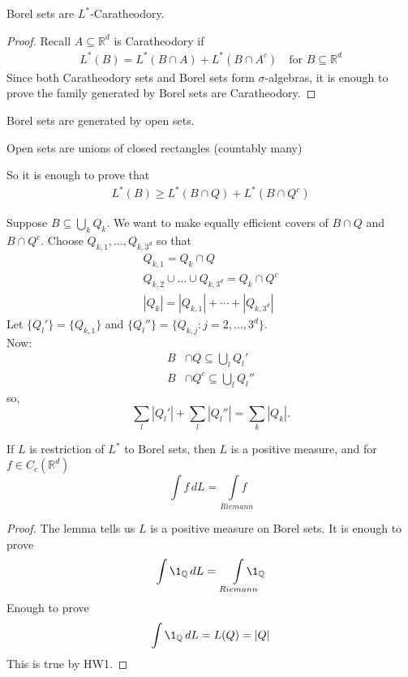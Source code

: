 \begin{lemma}
	Borel sets are $L^*$-Caratheodory.
\end{lemma}

\begin{proof}
	Recall $A \subseteq \mathbb{R}^d$ is Caratheodory if
	\begin{align*}
	L^*(B) = L^*(B \cap A ) + L^*(B \cap A^{c}) \quad \text{for } B \subseteq \mathbb{R}^d
	\end{align*}
	Since both Caratheodory sets and Borel sets form $\sigma$-algebras, it is enough to prove the family generated by Borel sets are Caratheodory.
\end{proof}

Borel sets are generated by open sets.

\begin{claim}
	Open sets are unions of closed rectangles (countably many)

	So it is enough to prove that
	\begin{align*}
	L^*(B) \geq L^*(B \cap Q) + L^* (B\cap Q^{c})
	\end{align*}
\end{claim}

Suppose $B \subseteq \bigcup_{k} Q_{k}$. We want to make equally efficient covers of $B \cap Q$ and $B \cap Q^{c}$. Choose $Q_{k,1}, \ldots , Q_{k,3^d}$ so that
\begin{gather*}
	Q_{k,1} = Q_{k} \cap Q \\
	Q_{k,2} \cup \ldots \cup Q_{k,3^d} = Q_{k} \cap Q^{c} \\
	|Q_{k}| = |Q_{k,1}| + \cdots + | Q_{k,3^d} |
\end{gather*}
Let $\{Q_{l}'\} = \{Q_{k,1}\}$ and $\{Q_{l}''\} = \{Q_{k,j} : j = 2, \ldots , 3^d\}$. \\
Now:
 \begin{align*}
	 B & \cap Q \subseteq \bigcup_{l} Q_{l}' \\
	 B & \cap Q^{c} \subseteq \bigcup_{l} Q_{l}''
\end{align*}
so,
\[
	\sum_{l} |Q_{l}'| + \sum_{l} | Q_{l}''| = \sum_{k} |Q_k|. 
\]

\begin{theorem}
	If $L$ is restriction of $L^*$ to Borel sets, then $L$ is a positive measure, and for $f \in C_{c} (\mathbb{R}^d)$
	\[
		\int f \,dL = \underset{Riemann}{\int f}
	\]
\end{theorem}

\begin{proof}
	The lemma tells us $L$ is a positive measure on Borel sets. It is enough to prove
	\[
		\int \1_{\mathbb{Q}} \,dL = \underset{Riemann}{\int} \kern-1em \1_{\mathbb{Q}}
	\]
	Enough to prove
	\[
		\int \1_{\mathbb{Q}} \,dL = L(Q) = |Q|
	\]
	This is true by HW1.
\end{proof}

